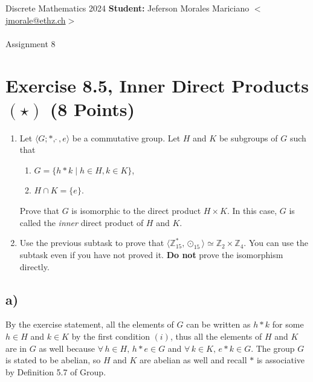 \documentclass[unicode,11pt,a4paper,oneside,numbers=endperiod,openany]{scrartcl}
\def\Z{\mathbb{Z}}
\begin{document}
\setassignment
{}

\serieheader
{Discrete Mathematics}
{2024}
{%
\textbf{Student:} Jeferson Morales Mariciano 
\href{mailto:jmorale@ethz.ch}{\(<\)jmorale@ethz.ch\(>\)} \\\\}
{\vspace{-1cm}}%
{Assignment 8}{}

\section*{Exercise 8.5, Inner Direct Products \( (\star) \) \hfill (8 Points)}

\begin{enumerate}[label=\textbf{\alph*)}]
    \item 
    Let \( \langle G; \ast, \widehat{\ }, e \rangle \) be a commutative group.
    Let \( H \) and \( K \) be subgroups of \( G \) such that

    \begin{enumerate}[label=(\roman*)]
        \item \( G = \{ h \ast k \mid h \in H, k \in K \} \),
        \item \( H \cap K = \{ e \} \).
    \end{enumerate}
    
    Prove that \( G \) is isomorphic to the direct product \( H \times K \).
    In this case, \( G \) is called the \textit{inner} direct product of \( H \) and \( K \).

    \item 
    Use the previous subtask to prove that 
    \( \langle \Z^{\ast}_{15}, \odot_{15} \rangle \simeq \Z_2 \times \Z_4 \).
    You can use the subtask even if you have not proved it.
    \textbf{Do not} prove the isomorphism directly.
\end{enumerate}

\subsection*{a)}

By the exercise statement, all the elements of \( G \) can be written as 
\( h \ast k \) for some \( h \in H \) and \( k \in K \) 
by the first condition \( (i) \),
thus all the elements of \( H \) and \( K \) are in \( G \) as well because 
\( \forall \, h \in H, \, h \ast e \in G \) and \( \forall \, k \in K, \, e \ast k \in G \).
The group \( G \) is stated to be abelian, 
so \( H \) and \( K \) are abelian as well 
and recall \( \ast \) is associative by Definition 5.7 of Group.
\end{document}
